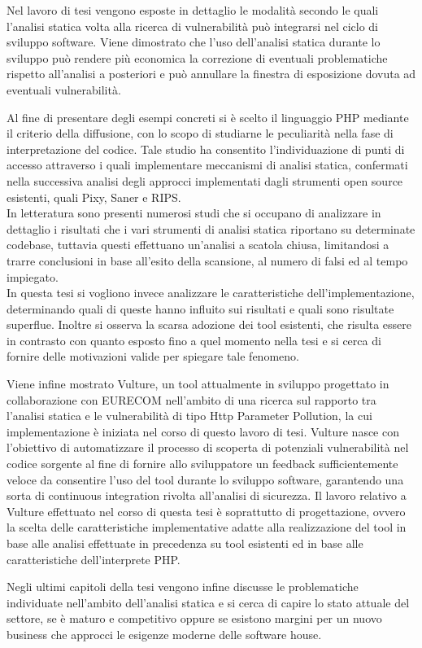 Nel lavoro di tesi vengono esposte in dettaglio le modalità secondo le quali l'analisi statica volta alla ricerca di vulnerabilità può integrarsi nel ciclo di sviluppo software. Viene dimostrato che l'uso dell'analisi statica durante lo sviluppo può rendere più economica la correzione di eventuali problematiche rispetto all'analisi a posteriori e può annullare la finestra di esposizione dovuta ad eventuali vulnerabilità. 

Al fine di presentare degli esempi concreti si è scelto il linguaggio PHP mediante il criterio della diffusione, con lo scopo di studiarne le peculiarità nella fase di interpretazione del codice. Tale studio ha consentito l'individuazione di punti di accesso attraverso i quali implementare meccanismi di analisi statica, confermati nella successiva analisi degli approcci implementati dagli strumenti open source esistenti, quali Pixy, Saner e RIPS. \\
In letteratura sono presenti numerosi studi\cite{depoel} che si occupano di analizzare in dettaglio i risultati che i vari strumenti di analisi statica riportano su determinate codebase, tuttavia questi effettuano un'analisi a scatola chiusa, limitandosi a trarre conclusioni in base all'esito della scansione, al numero di falsi ed al tempo impiegato.\\
In questa tesi si vogliono invece analizzare le caratteristiche dell'implementazione, determinando quali di queste hanno influito sui risultati e quali sono risultate superflue. Inoltre si osserva la scarsa adozione dei tool esistenti, che risulta essere in contrasto con quanto esposto fino a quel momento nella tesi e si cerca di fornire delle motivazioni valide per spiegare tale fenomeno.

Viene infine mostrato Vulture, un tool attualmente in sviluppo progettato in collaborazione con EURECOM nell'ambito di una ricerca sul rapporto tra l'analisi statica e le vulnerabilità di tipo Http Parameter Pollution, la cui implementazione è iniziata nel corso di questo lavoro di tesi. Vulture nasce con l'obiettivo di automatizzare il processo di scoperta di potenziali vulnerabilità nel codice sorgente al fine di fornire allo sviluppatore un feedback sufficientemente veloce da consentire l'uso del tool durante lo sviluppo software, garantendo una sorta di continuous integration\cite{fowler} rivolta all'analisi di sicurezza. Il lavoro relativo a Vulture effettuato nel corso di questa tesi è soprattutto di progettazione, ovvero la scelta delle caratteristiche implementative adatte alla realizzazione del tool in base alle analisi effettuate in precedenza su tool esistenti ed in base alle caratteristiche dell'interprete PHP.
 
Negli ultimi capitoli della tesi vengono infine discusse le problematiche individuate nell'ambito dell'analisi statica e si cerca di capire lo stato attuale del settore, se è maturo e competitivo oppure se esistono margini per un nuovo business che approcci le esigenze moderne delle software house.